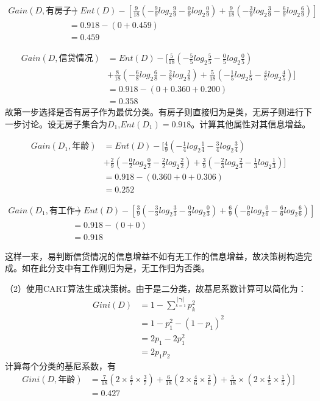 \documentclass{ctexart}
\begin{document}
\begin{align*}
Gain(D,\mbox{有房子})&=Ent(D)-[\frac{9}{18}(-\frac{9}{9}log_2\frac{9}{9}-\frac{0}{9}log_2\frac{0}{9})+\frac{9}{18}(-\frac{3}{9}log_2\frac{3}{9}-\frac{6}{9}log_2\frac{6}{9})]\\
&=0.918-(0+0.459)\\
&=0.459
\end{align*}

\begin{align*}
Gain(D,\mbox{信贷情况})&=Ent(D)-[\frac{5}{18}(-\frac{5}{5}log_2\frac{5}{5}-\frac{0}{5}log_2\frac{0}{5})\\&+\frac{8}{18}(-\frac{6}{8}log_2\frac{6}{8}-\frac{2}{8}log_2\frac{2}{8})+\frac{5}{18}(-\frac{1}{5}log_2\frac{1}{5}-\frac{4}{5}log_2\frac{4}{5})]\\
&=0.918-(0+0.360+ 0.200)\\
&=0.358
\end{align*}
故第一步选择是否有房子作为最优分类。有房子则直接归为是类，无房子则进行下一步讨论。设无房子集合为$D_1$,$Ent(D_1)=0.918$。计算其他属性对其信息增益。

\begin{align*}
Gain(D_1,\mbox{年龄})&=Ent(D)-[\frac{4}{9}(-\frac{1}{4}log_2\frac{1}{4}-\frac{3}{4}log_2\frac{3}{4})\\&+\frac{2}{9}(-\frac{0}{2}log_2\frac{0}{2}-\frac{2}{2}log_2\frac{2}{2})+\frac{3}{9}(-\frac{2}{3}log_2\frac{2}{3}-\frac{1}{3}log_2\frac{1}{3})]\\
&=0.918-(0.360+0+0.306)\\
&=0.252
\end{align*}

\begin{align*}
Gain(D_1,\mbox{有工作})&=Ent(D)-[\frac{3}{9}(-\frac{3}{3}log_2\frac{3}{3}-\frac{0}{3}log_2\frac{0}{3})+\frac{6}{9}(-\frac{0}{6}log_2\frac{0}{6}-\frac{6}{6}log_2\frac{6}{6})]\\
&=0.918-(0+0)\\
&=0.918
\end{align*}

这样一来，易判断信贷情况的信息增益不如有无工作的信息增益，故决策树构造完成。如在此分支中有工作则归为是，无工作归为否类。

（2）使用CART算法生成决策树。由于是二分类，故基尼系数计算可以简化为：
\begin{align*}
Gini(D)&=1-\sum\limits^{\bm{|\gamma}|}\limits_{k=1}p^2_k\\
&=1-p_1^2-(1-p_1)^2\\
&=2p_1-2p_1^2\\
&=2p_1p_2
\end{align*}
计算每个分类的基尼系数，有
\begin{align*}
Gini(D,\mbox{年龄})&=\frac{7}{18}(2\times\frac{4}{7}\times\frac{3}{7})+\frac{6}{18}(2\times\frac{4}{6}\times\frac{2}{6})+\frac{5}{18}\times(2\times\frac{4}{5}\times\frac{1}{5})]\\
&=0.427
\end{align*}
\end{document}
